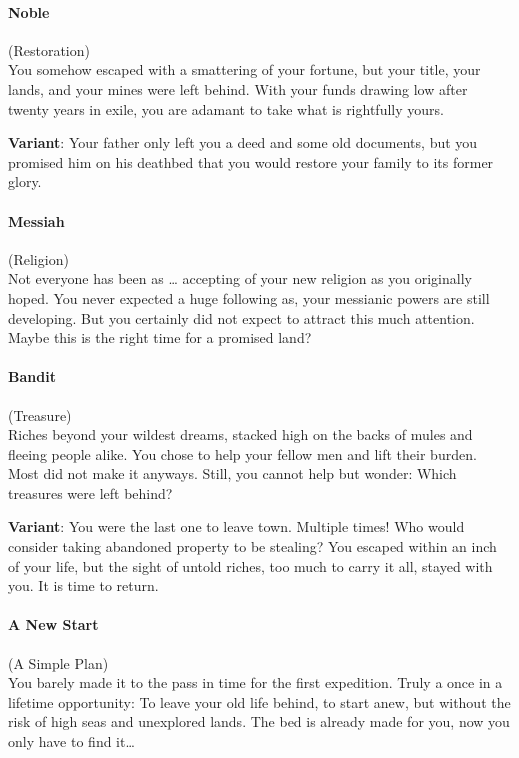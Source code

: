 \documentclass{zine}
\begin{document}
\paragraph{Noble}
(Restoration)\\
You somehow escaped with a smattering of your
fortune, but your title, your lands, and your mines were left behind. With
your funds drawing low after twenty years in exile, you are adamant to take
what is rightfully yours.

\textbf{Variant}: Your father only left you a deed and some old
documents, but you promised him on his deathbed that you would restore
your family to its former glory.


\paragraph{Messiah} (Religion) \\
Not everyone has been as … accepting of your new
religion as you originally hoped. You never expected a huge following as,
your messianic powers are still developing. But you certainly did not
expect to attract this much attention. Maybe this is the right time for
a promised land?


\paragraph{Bandit} (Treasure)\\
Riches beyond your wildest dreams, stacked high on
the backs of mules and fleeing people alike. You chose to help your
fellow men and lift their burden. Most did not make it anyways.
Still, you cannot help but wonder: Which treasures were left behind?

\textbf{Variant}: You were the last one to leave town. Multiple times!
Who would consider taking abandoned property to be stealing? You escaped
within an inch of your life, but the sight of untold riches, too much to
carry it all, stayed with you. It is time to return.

\paragraph{A New Start} (A Simple Plan)\\
You barely made it to the pass in time for the
first expedition. Truly a once in a lifetime opportunity: To leave your old life behind, to start anew, but without the risk of high seas and unexplored lands.
The bed is already made for you, now you only have to find it…
\end{document}
